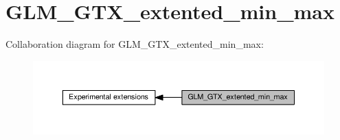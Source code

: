 \hypertarget{group__gtx__extended__min__max}{}\section{G\+L\+M\+\_\+\+G\+T\+X\+\_\+extented\+\_\+min\+\_\+max}
\label{group__gtx__extended__min__max}
Collaboration diagram for G\+L\+M\+\_\+\+G\+T\+X\+\_\+extented\+\_\+min\+\_\+max\+:
\nopagebreak
\begin{figure}[H]
\begin{center}
\leavevmode
\includegraphics[width=350pt]{df/d72/group__gtx__extended__min__max}
\end{center}
\end{figure}
